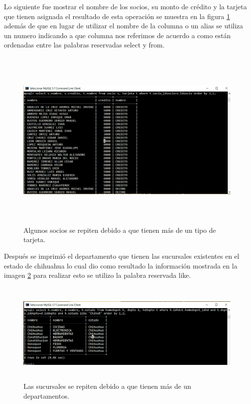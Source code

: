 \documentclass[12pt, titlepage]{article}
\begin{document}
Lo siguiente fue mostrar el nombre de los socios, su monto de crédito y la tarjeta que tienen asignada el resultado de esta operación se muestra en la figura \ref{fig:comando3} además de que en lugar de utilizar el nombre de la columna o un alias se utiliza un numero indicando a que columna nos referimos de acuerdo a como están ordenadas entre las palabras reservadas select y from.
 \begin{figure}[H]
	\begin{center}
		\includegraphics[width=16cm, height=9cm]{img/comando3.png}
		\caption{Algunos socios se repiten debido a que tienen más de un tipo de tarjeta.}
		\label{fig:comando3}
	\end{center}
\end{figure}
Después se imprimió el departamento que tienen las sucursales existentes en el estado de chihuahua lo cual dio como resultado la información mostrada en la imagen \ref{fig:comando4} para realizar esto se utilizo la palabra reservada like.
 \begin{figure}[H]
	\begin{center}
		\includegraphics[width=16cm, height=5cm]{img/comando4.png}
		\caption{Las sucursales se repiten debido a que tienen más de un departamentos.}
		\label{fig:comando4}
	\end{center}
\end{figure}
\end{document}
